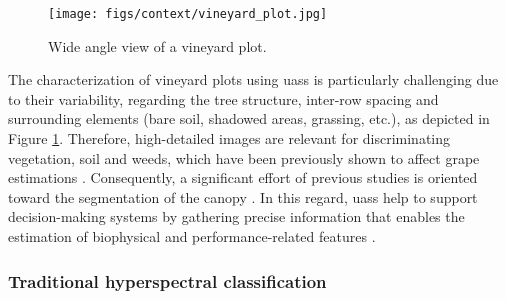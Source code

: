 \begin{figure}[ht]
	\texttt{[image: figs/context/vineyard\_plot.jpg]}
	\caption{Wide angle view of a vineyard plot.}
    \label{fig:vineyard_plot_sample}
\end{figure}

The characterization of vineyard plots using \acrshort{uas}s is particularly challenging due to their variability, regarding the tree structure, inter-row spacing and surrounding elements (bare soil, shadowed areas, grassing, etc.), as depicted in Figure \ref{fig:vineyard_plot_sample}. Therefore, high-detailed images are relevant for discriminating vegetation, soil and weeds, which have been previously shown to affect grape estimations \cite{ammoniaci_state_2021, sassu_advances_2021}. Consequently, a significant effort of previous studies is oriented toward the segmentation of the canopy \cite{padua_vineyard_2022}. In this regard, \acrshort{uas}s help to support decision-making systems by gathering precise information that enables the estimation of biophysical and performance-related features \cite{bramley_12_2010}.

\subsubsection{Traditional hyperspectral classification}

